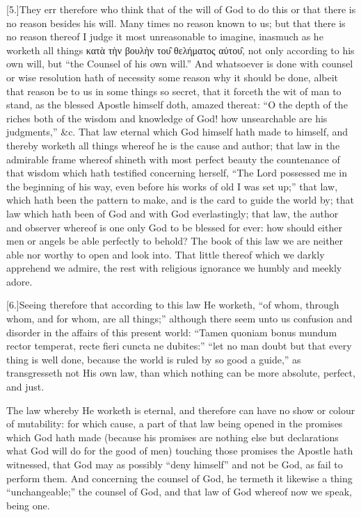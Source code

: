 [5.]They err therefore who think that of the will of God to do this or that there is no reason besides his will. Many times no reason known to us; but that there is no reason thereof I judge it most unreasonable to imagine, inasmuch as he worketh all things κατὰ τὴν βουλὴν του̑ θελήματος αὐτου̑, not only according to his own will, but “the Counsel of his own will.” And whatsoever is done with counsel or wise resolution hath of necessity some reason why it should be done, albeit that reason be to us in some things so secret, that it forceth the wit of man to stand, as the blessed Apostle himself doth, amazed thereat: “O the depth of the riches both of the wisdom and knowledge of God! how unsearchable are his judgments,” \&c. That law eternal which God himself hath made to himself, and thereby worketh all things whereof he is the cause and author; that law in the admirable frame whereof shineth with most perfect beauty the countenance of that wisdom which hath testified concerning herself, “The Lord possessed me in the beginning of his way, even before his works of old I was set up;” that law, which hath been the pattern to make, and is the card  to guide the world by; that law which hath been of God and with God everlastingly; that law, the author and observer whereof is one only God to be blessed for ever: how should either men or angels be able perfectly to behold? The book of this law we are neither able nor worthy to open and look into. That little thereof which we darkly apprehend we admire, the rest with religious ignorance we humbly and meekly adore.

[6.]Seeing therefore that according to this law He worketh, “of whom, through whom, and for whom, are all things;” although there seem unto us confusion and disorder in the affairs of this present world: “Tamen quoniam bonus mundum rector temperat, recte fieri cuncta ne dubites:” “let no man doubt but that every thing is well done, because the world is ruled by so good a guide,” as transgresseth not His own law, than which nothing can be more absolute, perfect, and just.

The law whereby He worketh is eternal, and therefore can have no show or colour of mutability: for which cause, a part of that law being opened in the promises which God hath made (because his promises are nothing else but declarations what God will do for the good of men) touching those promises the Apostle hath witnessed, that God may as possibly “deny himself” and not be God, as fail to perform them. And concerning the counsel of God, he termeth it likewise a thing “unchangeable;” the counsel of God, and that law of God whereof now we speak, being one.

